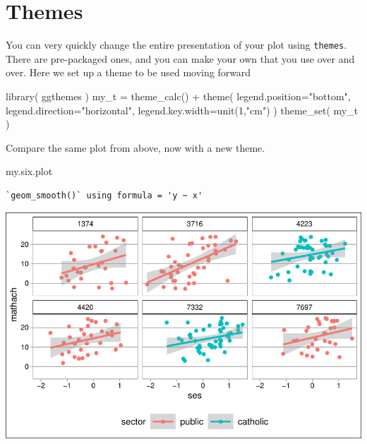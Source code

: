 \documentclass[
  letterpaper,
  DIV=11,
  numbers=noendperiod]{scrreprt}
\newenvironment{Shaded}{}{}
\newcommand{\AttributeTok}[1]{\textcolor[rgb]{0.49,0.56,0.16}{#1}}
\newcommand{\DecValTok}[1]{\textcolor[rgb]{0.25,0.63,0.44}{#1}}
\newcommand{\FunctionTok}[1]{\textcolor[rgb]{0.02,0.16,0.49}{#1}}
\newcommand{\NormalTok}[1]{#1}
\newcommand{\OtherTok}[1]{\textcolor[rgb]{0.00,0.44,0.13}{#1}}
\newcommand{\SpecialCharTok}[1]{\textcolor[rgb]{0.25,0.44,0.63}{#1}}
\newcommand{\StringTok}[1]{\textcolor[rgb]{0.25,0.44,0.63}{#1}}
\begin{document}
\section{Themes}\label{themes}

You can very quickly change the entire presentation of your plot using
\texttt{themes}. There are pre-packaged ones, and you can make your own
that you use over and over. Here we set up a theme to be used moving
forward

\begin{Shaded}
\begin{Highlighting}[]
\FunctionTok{library}\NormalTok{( ggthemes )}
\NormalTok{my\_t }\OtherTok{=} \FunctionTok{theme\_calc}\NormalTok{() }\SpecialCharTok{+} \FunctionTok{theme}\NormalTok{( }\AttributeTok{legend.position=}\StringTok{"bottom"}\NormalTok{, }
                             \AttributeTok{legend.direction=}\StringTok{"horizontal"}\NormalTok{, }
                             \AttributeTok{legend.key.width=}\FunctionTok{unit}\NormalTok{(}\DecValTok{1}\NormalTok{,}\StringTok{"cm"}\NormalTok{)  )}
\FunctionTok{theme\_set}\NormalTok{( my\_t )}
\end{Highlighting}
\end{Shaded}

Compare the same plot from above, now with a new theme.

\begin{Shaded}
\begin{Highlighting}[]
\NormalTok{my.six.plot}
\end{Highlighting}
\end{Shaded}

\begin{verbatim}
`geom_smooth()` using formula = 'y ~ x'
\end{verbatim}

\includegraphics{intro_ggplot_files/figure-pdf/unnamed-chunk-10-1.pdf}
\end{document}
